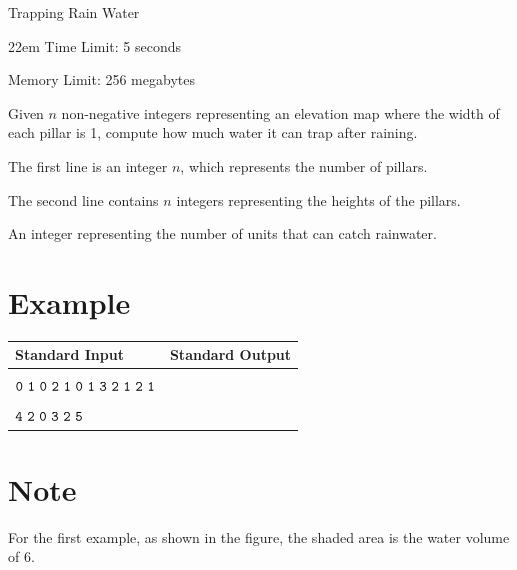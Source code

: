\documentclass{xcpc}
\begin{document}
	\begin{problem}{Trapping Rain Water}
		\begin{boxedminipage}[c][1cm][t]{22em} 
			Time Limit: 5 seconds
			
			Memory Limit: 256 megabytes
		\end{boxedminipage}
		
		Given $n$ non-negative integers representing an elevation map where the width of each pillar is 1, compute how much water it can trap after raining.
		
		\begin{inputdes}
			The first line is an integer $n$, which represents the number of pillars.
			
			The second line contains $n$ integers representing the heights of the pillars.
		\end{inputdes}
		
		\begin{outputdes}
			An integer representing the number of units that can catch rainwater.
		\end{outputdes}

		\section*{Example}

		\begin{table}[h]
		\begin{tabularx}{\textwidth}{|>{\raggedright\arraybackslash}X|>{\raggedright\arraybackslash}X|}
			\hline
			\textbf{Standard Input} & \textbf{Standard Output} \\ \hline
			\makecell[l]{$\tt{12}$\\$\tt{0\ 1\ 0\ 2\ 1\ 0\ 1\ 3\ 2\ 1\ 2\ 1}$} & \makecell[l]{$\tt{6}$} \\ \hline
			\makecell[l]{$\tt{6}$\\$\tt{4\ 2\ 0\ 3\ 2\ 5}$} & \makecell[l]{$\tt{9}$} \\ \hline
		\end{tabularx}
	\end{table}
		
		\section*{Note}
		
		For the first example, as shown in the figure, the shaded area is the water volume of 6.
		
\end{problem}
\end{document}
